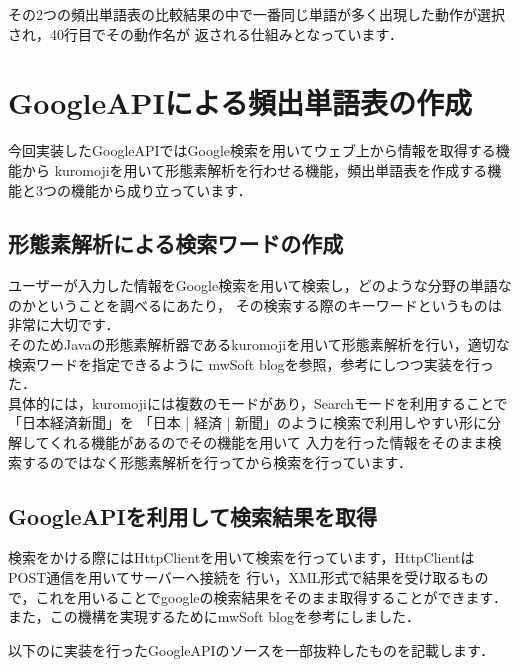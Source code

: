 その2つの頻出単語表の比較結果の中で一番同じ単語が多く出現した動作が選択され，40行目でその動作名が
返される仕組みとなっています．\\




\section{GoogleAPIによる頻出単語表の作成}
今回実装したGoogleAPIではGoogle検索を用いてウェブ上から情報を取得する機能から
kuromojiを用いて形態素解析を行わせる機能，頻出単語表を作成する機能と3つの機能から成り立っています．
\\
\subsection{形態素解析による検索ワードの作成}
ユーザーが入力した情報をGoogle検索を用いて検索し，どのような分野の単語なのかということを調べるにあたり，
その検索する際のキーワードというものは非常に大切です．\\

そのためJavaの形態素解析器であるkuromoji\cite{gitkuromoji}を用いて形態素解析を行い，適切な検索ワードを指定できるように
mwSoft blog\cite{kuromoji}を参照，参考にしつつ実装を行った．\\

具体的には，kuromojiには複数のモードがあり，Searchモードを利用することで「日本経済新聞」を
「日本 | 経済 | 新聞」のように検索で利用しやすい形に分解してくれる機能があるのでその機能を用いて
入力を行った情報をそのまま検索するのではなく形態素解析を行ってから検索を行っています．\\



\subsection{GoogleAPIを利用して検索結果を取得}
検索をかける際にはHttpClientを用いて検索を行っています，HttpClientはPOST通信を用いてサーバーへ接続を
行い，XML形式で結果を受け取るもので，これを用いることでgoogleの検索結果をそのまま取得することができます．\\
また，この機構を実現するためにmwSoft blog\cite{google}を参考にしました．

以下のに実装を行ったGoogleAPIのソースを一部抜粋したものを記載します．

